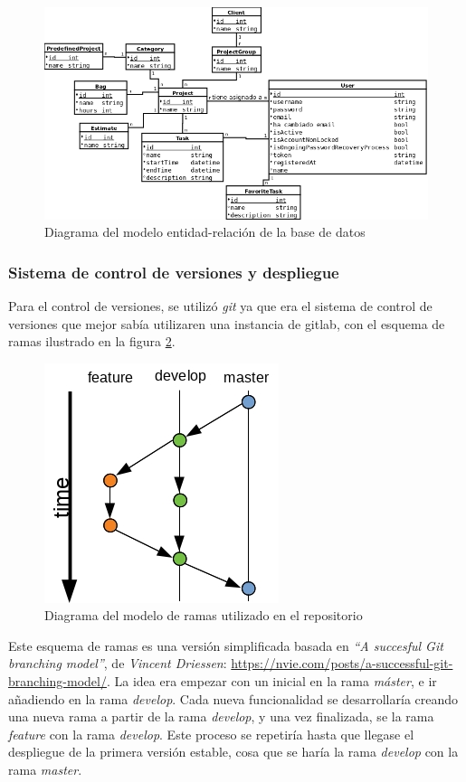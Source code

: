 \begin{figure}[p]
    \center
    \includegraphics[angle=90,scale=0.6]{img/erDiagram}
    \caption{Diagrama del modelo entidad-relación de la base de
datos\label{fig:erdiag}}
\end{figure}

\subsubsection{Sistema de control de versiones y despliegue}
Para el control de versiones, se utilizó \textit{git} \textemdash ya que era
el sistema de control de versiones que mejor sabía utilizar\textemdash en una instancia de
\gls{gitlab}, con el esquema de ramas ilustrado en la figura \ref{fig:branches}.

\begin{figure}[h]
    \center
    \includegraphics[scale=1]{img/branching}
    \caption{Diagrama del modelo de ramas utilizado en el repositorio}
    \label{fig:branches}
\end{figure}

Este esquema de ramas es una versión simplificada basada en \textit{``A succesful
Git branching model''}, de \textit{Vincent Driessen}: \url{https://nvie.com/posts/a-successful-git-branching-model/}.
La idea era empezar con un  inicial en la rama \textit{máster},
e ir añadiendo  en la rama \textit{develop}. Cada nueva
funcionalidad se desarrollaría creando una nueva rama a partir de la rama \textit{develop},
y una vez finalizada, se  la rama \textit{feature} con
la rama \textit{develop}.  Este proceso se repetiría hasta que llegase el despliegue
de la primera versión estable, cosa que se haría  la
rama \textit{develop} con la rama \textit{master}.

